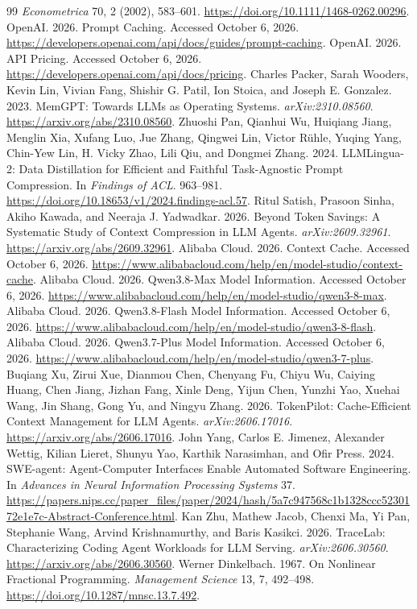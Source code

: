 \documentclass[sigconf,screen,nonacm]{acmart}
\begin{document}
\begin{thebibliography}{99}
\emph{Econometrica} 70, 2 (2002), 583--601.
\url{https://doi.org/10.1111/1468-0262.00296}.
OpenAI. 2026. Prompt Caching. Accessed October 6, 2026.
\url{https://developers.openai.com/api/docs/guides/prompt-caching}.
OpenAI. 2026. API Pricing. Accessed October 6, 2026.
\url{https://developers.openai.com/api/docs/pricing}.
Charles Packer, Sarah Wooders, Kevin Lin, Vivian Fang, Shishir G. Patil,
Ion Stoica, and Joseph E. Gonzalez. 2023. MemGPT: Towards LLMs as Operating
Systems. \emph{arXiv:2310.08560}. \url{https://arxiv.org/abs/2310.08560}.
Zhuoshi Pan, Qianhui Wu, Huiqiang Jiang, Menglin Xia, Xufang Luo, Jue Zhang,
Qingwei Lin, Victor R\"uhle, Yuqing Yang, Chin-Yew Lin, H. Vicky Zhao,
Lili Qiu, and Dongmei Zhang. 2024. LLMLingua-2: Data Distillation for Efficient
and Faithful Task-Agnostic Prompt Compression. In \emph{Findings of ACL}.
963--981. \url{https://doi.org/10.18653/v1/2024.findings-acl.57}.
Ritul Satish, Prasoon Sinha, Akiho Kawada, and Neeraja J. Yadwadkar. 2026.
Beyond Token Savings: A Systematic Study of Context Compression in LLM Agents.
\emph{arXiv:2609.32961}. \url{https://arxiv.org/abs/2609.32961}.
Alibaba Cloud. 2026. Context Cache. Accessed October 6, 2026.
\url{https://www.alibabacloud.com/help/en/model-studio/context-cache}.
Alibaba Cloud. 2026. Qwen3.8-Max Model Information. Accessed October 6, 2026.
\url{https://www.alibabacloud.com/help/en/model-studio/qwen3-8-max}.
Alibaba Cloud. 2026. Qwen3.8-Flash Model Information. Accessed October 6, 2026.
\url{https://www.alibabacloud.com/help/en/model-studio/qwen3-8-flash}.
Alibaba Cloud. 2026. Qwen3.7-Plus Model Information. Accessed October 6, 2026.
\url{https://www.alibabacloud.com/help/en/model-studio/qwen3-7-plus}.
Buqiang Xu, Zirui Xue, Dianmou Chen, Chenyang Fu, Chiyu Wu, Caiying Huang,
Chen Jiang, Jizhan Fang, Xinle Deng, Yijun Chen, Yunzhi Yao, Xuehai Wang,
Jin Shang, Gong Yu, and Ningyu Zhang. 2026. TokenPilot: Cache-Efficient
Context Management for LLM Agents. \emph{arXiv:2606.17016}.
\url{https://arxiv.org/abs/2606.17016}.
John Yang, Carlos E. Jimenez, Alexander Wettig, Kilian Lieret, Shunyu Yao,
Karthik Narasimhan, and Ofir Press. 2024. SWE-agent: Agent-Computer Interfaces
Enable Automated Software Engineering. In \emph{Advances in Neural Information
Processing Systems} 37.
\url{https://papers.nips.cc/paper_files/paper/2024/hash/5a7c947568c1b1328ccc5230172e1e7c-Abstract-Conference.html}.
Kan Zhu, Mathew Jacob, Chenxi Ma, Yi Pan, Stephanie Wang, Arvind Krishnamurthy,
and Baris Kasikci. 2026. TraceLab: Characterizing Coding Agent Workloads for
LLM Serving. \emph{arXiv:2606.30560}.
\url{https://arxiv.org/abs/2606.30560}.
Werner Dinkelbach. 1967. On Nonlinear Fractional Programming.
\emph{Management Science} 13, 7, 492--498.
\url{https://doi.org/10.1287/mnsc.13.7.492}.


\end{thebibliography}
\end{document}
